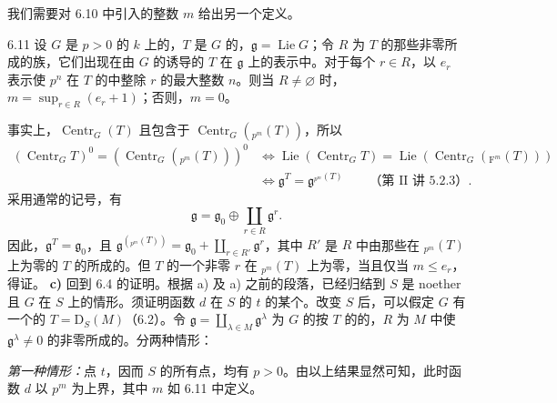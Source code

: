 我们需要对 6.10 中引入的整数 $m$ 给出另一个定义。
\begin{SGAresult}{}{6.11}
设 $G$ 是 $p>0$ 的 $k$ 上的，$T$ 是 $G$ 的，$\mathfrak g=\operatorname{Lie}G$；令 $R$ 为 $T$ 的那些非零所成的族，它们出现在由 $G$ 的诱导的 $T$ 在 $\mathfrak g$ 上的表示中。对于每个 $r\in R$，以 $e_r$ 表示使 $p^n$ 在 $T$ 的中整除 $r$ 的最大整数 $n$。则当 $R\ne\varnothing$ 时，$m=\sup_{r\in R}(e_r+1)$；否则，$m=0$。
\end{SGAresult}
事实上，$\operatorname{Centr}_G(T)$ 且包含于 $\operatorname{Centr}_G({}_{p^m}(T))$，所以
\begin{align*}
(\operatorname{Centr}_GT)^0=(\operatorname{Centr}_G({}_{p^m}(T)))^0
&\Longleftrightarrow\operatorname{Lie}(\operatorname{Centr}_GT)=\operatorname{Lie}(\operatorname{Centr}_G({}_{\mathrm F^m}(T)))\\
&\Longleftrightarrow\mathfrak g^T=\mathfrak g^{{}_{p^m}(T)}\qquad\text{（第 II 讲 5.2.3）}.
\end{align*}
采用通常的记号，有
\[\mathfrak g=\mathfrak g_0\oplus\coprod_{r\in R}\mathfrak g^r.\]
因此，$\mathfrak g^T=\mathfrak g_0$，且 $\mathfrak g^{({}_{p^m}(T))}=\mathfrak g_0+\coprod_{r\in R'}\mathfrak g^r$，其中 $R'$ 是 $R$ 中由那些在 ${}_{p^m}(T)$ 上为零的 $T$ 的所成的。但 $T$ 的一个非零 $r$ 在 ${}_{p^m}(T)$ 上为零，当且仅当 $m\leq e_r$，得证。
\textbf{c)} 回到 6.4 的证明。根据 a) 及 a) 之前的段落，已经归结到 $S$ 是 noether 且 $G$ 在 $S$ 上的情形。须证明函数 $d$ 在 $S$ 的 $t$ 的某个。改变 $S$ 后，可以假定 $G$ 有一个的 $T=\mathrm D_S(M)$（6.2）。令 $\mathfrak g=\coprod_{\lambda\in M}\mathfrak g^{\lambda}$ 为 $G$ 的按 $T$ 的的，$R$ 为 $M$ 中使 $\mathfrak g^{\lambda}\ne0$ 的非零所成的。分两种情形：

\emph{第一种情形：}点 $t$，因而 $S$ 的所有点，均有 $p>0$。由以上结果显然可知，此时函数 $d$ 以 $p^m$ 为上界，其中 $m$ 如 6.11 中定义。

